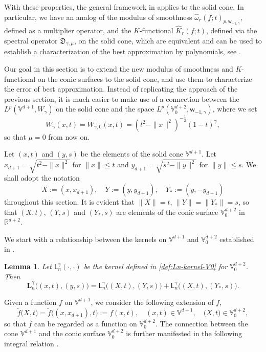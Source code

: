 \documentclass{amsart}
\newtheorem{lem}[thm]{Lemma}
\theoremstyle{remark}
\def\g{{\gamma}}
\def\o{{\omega}}
\def\Lb{{\mathbf L}}
\def\RR{{\mathbb R}}
\def\VV{{\mathbb V}}
\def\sL{{\mathsf L}}
\def\sw{{\mathsf w}}
\def\fD{{\mathfrak D}}
\def\g{{\gamma}}
\def\o{{\omega}}
\def\Lb{{\mathbf L}}
\def\RR{{\mathbb R}}
\def\VV{{\mathbb V}}
\newcommand{\wh}{\widehat}
\def\fD{{\mathfrak D}}
\def\f{\frac}
\def\f{\frac}
\begin{document}
With these properties, the general framework in \cite{X21} applies to the solid cone. In particular, we have 
an analog of the modulus of smoothness $\widehat{\o}_r(f; t)_{p,\sw_{-1,\g}}$, defined as a multiplier operator, 
and the $K$-functional $\wh K_r(f;t)$, defined via the spectral operator $\fD_{\g,\mu}$, on the solid cone, 
which are equivalent and can be used to establish a characterization of the best approximation by polynomials,
see \cite[Section 5.7]{X21}. 
 
Our goal in this section is to extend the new modulus of smoothness and $K$-functional on the conic surfaces 
to the solid cone, and use them to characterize the error of best approximation. Instead of replicating the 
approach of the previous section, it is much easier to make use of a connection between the $L^p(\VV^{d+1}, W_\g)$ 
on the solid cone and the space $L^p(\VV_0^{d+2}, \sw_{-1,\g})$, where we set
$$
     W_\g(x,t) = W_{\g,0} (x,t) = (t^2-\|x\|^2)^{-\f12} (1-t)^\g,
$$
so that $\mu = 0$ from now on.  
 
Let $(x,t)$ and $(y,s)$ be the elements of the solid cone $\VV^{d+1}$. Let $x_{d+1} = \sqrt{t^2-\|x\|^2}$ for $\|x\| \le t$ 
and $y_{d+1} = \sqrt{s^2-\|y\|^2}$   for $\|y\| \le s$. We shall adopt the notation 
\begin{equation}\label{eq:XY}  
X:=(x,x_{d+1}), \quad Y:=(y,y_{d+1}), \quad Y_*:=(y, - y_{d+1})
\end{equation} 
throughout this section. It is evident that $\|X\| = t$, $\|Y\| = \|Y_*\| =s$, so that $(X,t)$, $(Y,s)$ and $(Y_*,s)$ 
are elements of the conic surface $\VV_0^{d+2}$ in $\RR^{d+2}$. 

We start with a relationship between the kernels on \(\VV^{d+1}\) and \(\VV_0^{d+2}\) established in \cite[Proposition 4.3]{X23}.

\begin{lem}\label{lem3.4}
Let $\sL_n^\g(\cdot,\cdot)$ be the kernel defined in \eqref{def:Ln-kernel-V0} for $\VV_0^{d+2}$. Then
\begin{equation} \label{eq:LnW-Lnw}
   \Lb_n^\g\big((x,t), (y,s)\big) = \sL_n^\g\big((X,t), (Y,s)\big) + \sL_n^\g \big((X,t), (Y_*,s)\big). 
\end{equation}
\end{lem}

Given a function $f$ on $\VV^{d+1}$, we consider the following extension of $f$, 
\begin{equation}\label{eq:XY2}
	\tilde{f}\big(X, t\big)=\tilde{f}\big((x,x_{d+1}), t\big):=f(x,t), \quad  (x,t) \in \VV^{d+1}, \quad
	\big(X, t\big)\in\VV_0^{d+2},
\end{equation} 
so that $f$ can be regarded as a function on $\VV_0^{d+2}$.  The connection between the cone $\VV^{d+1}$
and the conic surface $\VV_0^{d+2}$ is further manifested in the following integral relation 
\cite[Proposition 4.4]{X23}. 
\end{document}
